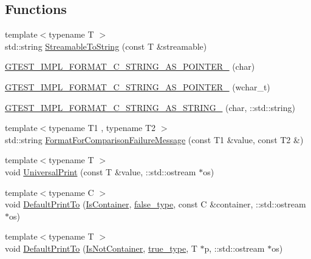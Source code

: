\subsection*{Functions}
\begin{DoxyCompactItemize}
\item 
{\footnotesize template$<$typename T $>$ }\\std\+::string \mbox{\hyperlink{namespacetesting_1_1internal_aad4beed95d0846e6ffc5da0978ef3bb9}{Streamable\+To\+String}} (const T \&streamable)
\item 
\mbox{\hyperlink{namespacetesting_1_1internal_a3682f962ae0ec1c0eca6444ca0a09e91}{G\+T\+E\+S\+T\+\_\+\+I\+M\+P\+L\+\_\+\+F\+O\+R\+M\+A\+T\+\_\+\+C\+\_\+\+S\+T\+R\+I\+N\+G\+\_\+\+A\+S\+\_\+\+P\+O\+I\+N\+T\+E\+R\+\_\+}} (char)
\item 
\mbox{\hyperlink{namespacetesting_1_1internal_a85e08f00d443221e529a0a85a90fbaeb}{G\+T\+E\+S\+T\+\_\+\+I\+M\+P\+L\+\_\+\+F\+O\+R\+M\+A\+T\+\_\+\+C\+\_\+\+S\+T\+R\+I\+N\+G\+\_\+\+A\+S\+\_\+\+P\+O\+I\+N\+T\+E\+R\+\_\+}} (wchar\+\_\+t)
\item 
\mbox{\hyperlink{namespacetesting_1_1internal_aeac30230dcc362221bdd07d61eaa4ec1}{G\+T\+E\+S\+T\+\_\+\+I\+M\+P\+L\+\_\+\+F\+O\+R\+M\+A\+T\+\_\+\+C\+\_\+\+S\+T\+R\+I\+N\+G\+\_\+\+A\+S\+\_\+\+S\+T\+R\+I\+N\+G\+\_\+}} (char, \+::std\+::string)
\item 
{\footnotesize template$<$typename T1 , typename T2 $>$ }\\std\+::string \mbox{\hyperlink{namespacetesting_1_1internal_a91ab078f10adc669f09b7f604975c518}{Format\+For\+Comparison\+Failure\+Message}} (const T1 \&value, const T2 \&)
\item 
{\footnotesize template$<$typename T $>$ }\\void \mbox{\hyperlink{namespacetesting_1_1internal_a30708fa2bacf11895b03bdb21eb72309}{Universal\+Print}} (const T \&value, \+::std\+::ostream $\ast$os)
\item 
{\footnotesize template$<$typename C $>$ }\\void \mbox{\hyperlink{namespacetesting_1_1internal_ac7dfe02c4c1cbfe89c23a93d873079c5}{Default\+Print\+To}} (\mbox{\hyperlink{namespacetesting_1_1internal_ad8f0c2883245f1df2a53618a49f0deb3}{Is\+Container}}, \mbox{\hyperlink{namespacetesting_1_1internal_abb1d0789f19bdde21affccbd1078b525}{false\+\_\+type}}, const C \&container, \+::std\+::ostream $\ast$os)
\item 
{\footnotesize template$<$typename T $>$ }\\void \mbox{\hyperlink{namespacetesting_1_1internal_affa1f94e3ba8db8b964553c2871bf339}{Default\+Print\+To}} (\mbox{\hyperlink{namespacetesting_1_1internal_abf080521ce135deb510e0a7830fd3d33}{Is\+Not\+Container}}, \mbox{\hyperlink{namespacetesting_1_1internal_a62f917c3424d8841de9b49b5ec28edb4}{true\+\_\+type}}, T $\ast$p, \+::std\+::ostream $\ast$os)

\end{DoxyCompactItemize}

